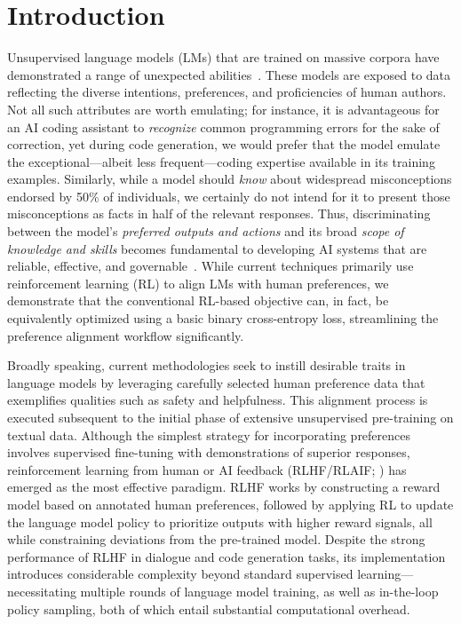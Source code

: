 \section{Introduction}
Unsupervised language models (LMs) that are trained on massive corpora have demonstrated a range of unexpected abilities~\citep{chowdhery2022palm, brown2020language, touvron2023llama,bubeck2023sparks}. These models are exposed to data reflecting the diverse intentions, preferences, and proficiencies of human authors. Not all such attributes are worth emulating; for instance, it is advantageous for an AI coding assistant to \textit{recognize} common programming errors for the sake of correction, yet during code generation, we would prefer that the model emulate the exceptional—albeit less frequent—coding expertise available in its training examples. Similarly, while a model should \textit{know} about widespread misconceptions endorsed by 50\% of individuals, we certainly do not intend for it to present those misconceptions as facts in half of the relevant responses. Thus, discriminating between the model's \emph{preferred outputs and actions} and its broad \textit{scope of knowledge and skills} becomes fundamental to developing AI systems that are reliable, effective, and governable~\citep{ouyang2022training}. While current techniques primarily use reinforcement learning (RL) to align LMs with human preferences, we demonstrate that the conventional RL-based objective can, in fact, be equivalently optimized using a basic binary cross-entropy loss, streamlining the preference alignment workflow significantly.

Broadly speaking, current methodologies seek to instill desirable traits in language models by leveraging carefully selected human preference data that exemplifies qualities such as safety and helpfulness. This alignment process is executed subsequent to the initial phase of extensive unsupervised pre-training on textual data. Although the simplest strategy for incorporating preferences involves supervised fine-tuning with demonstrations of superior responses, reinforcement learning from human or AI feedback (RLHF/RLAIF; \citep{christiano2017deep,bai2022constitutional}) has emerged as the most effective paradigm. RLHF works by constructing a reward model based on annotated human preferences, followed by applying RL to update the language model policy to prioritize outputs with higher reward signals, all while constraining deviations from the pre-trained model. Despite the strong performance of RLHF in dialogue and code generation tasks, its implementation introduces considerable complexity beyond standard supervised learning—necessitating multiple rounds of language model training, as well as in-the-loop policy sampling, both of which entail substantial computational overhead.

